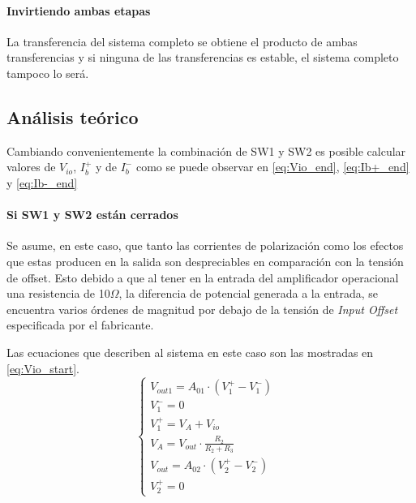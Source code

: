 \paragraph{Invirtiendo ambas etapas}
La transferencia del sistema completo se obtiene el producto de ambas transferencias y si ninguna de las transferencias es estable, el sistema completo tampoco lo ser\'a.
\par


\subsection{An\'alisis te\'orico}
Cambiando convenientemente la combinaci\'on de SW1 y SW2 es posible calcular valores de $V_{io}$, $I_b^+$ y de $I_b^-$  como se puede observar en \ref{eq:Vio_end}, \ref{eq:Ib+_end} y \ref{eq:Ib-_end}

\paragraph{Si SW1 y SW2 est\'an cerrados}

Se asume, en este caso, que tanto las corrientes de polarizaci\'on como los efectos que estas producen en la salida son despreciables en comparaci\'on con la tensi\'on de offset. Esto debido a que al tener en la entrada del amplificador operacional una resistencia de 10$\Omega$, la diferencia de potencial generada a la entrada, se encuentra varios \'ordenes de magnitud por debajo de la tensi\'on de \textit{Input Offset} especificada por el fabricante.

Las ecuaciones que describen al sistema en este caso son las mostradas en \ref{eq:Vio_start}.
\begin{equation}
    \left\{
    \begin{array}{lllll}
        V_{out1}=A_{01} \cdot (V_1^+ - V_1^-)\\
        
        V_1^- = 0 &\\
        
        V_1^+ = V_A + V_{io}\\
        
        V_A = V_{out} \cdot \frac{R_2}{R_2 + R_3}\\
        
        V_{out} = A_{02} \cdot (V_2^+ - V_2^-)\\
        
        V_2^+ = 0
    \end{array}
  \right.
  \label{eq:Vio_start}
\end{equation}

